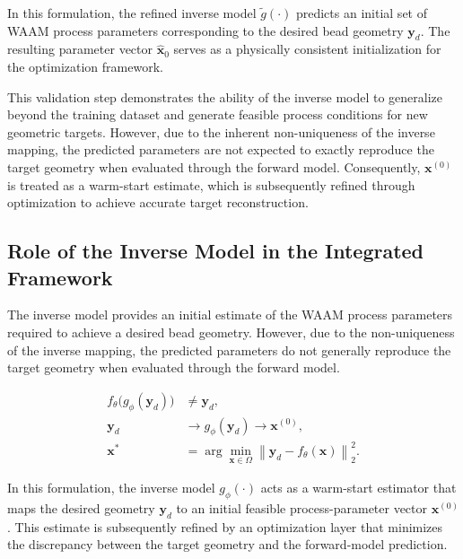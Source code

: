 \documentclass[11pt]{article}
\begin{document}
In this formulation, the refined inverse model $\tilde{g}(\cdot)$ predicts an initial set of WAAM process parameters corresponding to the desired bead geometry $\mathbf{y}_d$. The resulting parameter vector $\hat{\mathbf{x}}_{0}$ serves as a physically consistent initialization for the optimization framework.

This validation step demonstrates the ability of the inverse model to generalize beyond the training dataset and generate feasible process conditions for new geometric targets. However, due to the inherent non-uniqueness of the inverse mapping, the predicted parameters are not expected to exactly reproduce the target geometry when evaluated through the forward model. Consequently, $\mathbf{x}^{(0)}$ is treated as a warm-start estimate, which is subsequently refined through optimization to achieve accurate target reconstruction.

\subsection{Role of the Inverse Model in the Integrated Framework}

The inverse model provides an initial estimate of the WAAM process parameters required to achieve a desired bead geometry. However, due to the non-uniqueness of the inverse mapping, the predicted parameters do not generally reproduce the target geometry when evaluated through the forward model.

\begin{tcolorbox}[colback=white,colframe=black,boxrule=0.5pt,arc=2pt]
\begin{equation}
\begin{aligned}
f_{\theta}\big(g_{\phi}(\mathbf{y}_{d})\big) &\neq \mathbf{y}_{d}, \\
\mathbf{y}_{d} &\rightarrow g_{\phi}(\mathbf{y}_{d}) \rightarrow \mathbf{x}^{(0)}, \\
\mathbf{x}^{*} &= \arg\min_{\mathbf{x}\in\Omega}
\left\| \mathbf{y}_{d} - f_{\theta}(\mathbf{x}) \right\|_2^2.
\end{aligned}
\end{equation}
\end{tcolorbox}

In this formulation, the inverse model $g_{\phi}(\cdot)$ acts as a warm-start estimator that maps the desired geometry $\mathbf{y}_d$ to an initial feasible process-parameter vector $\mathbf{x}^{(0)}$. This estimate is subsequently refined by an optimization layer that minimizes the discrepancy between the target geometry and the forward-model prediction.
\end{document}
